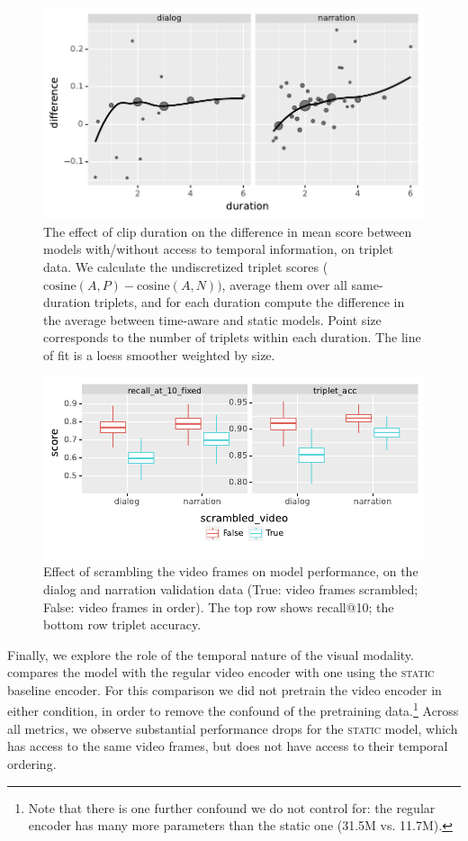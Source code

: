 \begin{figure}[htb]
  \centering
  \includegraphics[width=\columnwidth]{results/duration_effect.pdf}
  \caption{The effect of clip duration on the difference in
    mean score between models with/without access to temporal
    information, on triplet data. We calculate the 
    undiscretized triplet scores ($\mathrm{cosine}(A, P) - \mathrm{cosine}(A,
    N))$, average them over all same-duration triplets, and
    for each duration compute the difference in the average between
    time-aware and static models. Point size corresponds
    to the number of triplets within each duration. The line of fit is
    a {\sc loess} smoother weighted by size.}
  \label{fig:duration_effect}
\end{figure}
\begin{figure}[htb]
	\centering
	\includegraphics[width=\columnwidth]{results/ablations/scrambled_video.pdf}
	\caption{Effect of scrambling the video frames on model performance, on the 
	dialog and narration validation data (True: video frames scrambled;
        False: video frames in order). The top row shows recall@10;
		the bottom row triplet accuracy.}
	\label{fig:scrambled_video}
      \end{figure}
Finally, we explore the role of the temporal nature of the visual
modality.   compares the model with the regular video
encoder with one using the \textsc{static} baseline encoder.  For this
comparison we did not pretrain the video encoder in either condition,
in order to remove the confound of the pretraining data.\footnote{Note
  that there is one further confound we do not control for: the
  regular encoder has many more parameters than the {\sc static} one (31.5M vs. 11.7M).}
Across all
metrics, we observe substantial performance drops for the
\textsc{static} model, which has access to the same video frames, but
does not have access to their temporal ordering.

